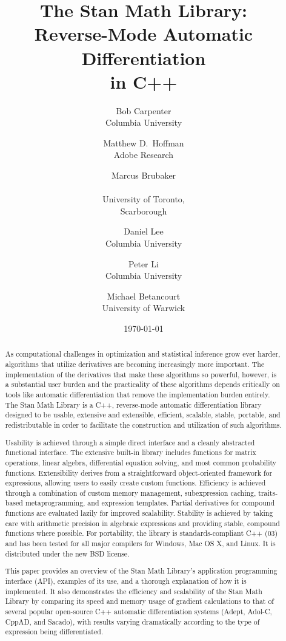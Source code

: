 \documentclass[12pt]{article}
\title{The Stan Math Library: \\ Reverse-Mode Automatic
  Differentiation \\ in C++}
\author{Bob Carpenter \\ {\small Columbia University}
        \and Matthew D.\ Hoffman \\ {\small Adobe Research}
        \and Marcus Brubaker 
        \\ {\small \begin{tabular}{c}University of Toronto, \\ Scarborough\end{tabular}}
        \and Daniel Lee \\ {\small Columbia University}
        \and Peter Li \\ {\small Columbia University}
        \and Michael Betancourt \\ {\small University of Warwick}
}
\date{\vspace*{8pt}\normalsize \today}
\begin{document}
\maketitle
\thispagestyle{empty}

\begin{abstract} 
  \noindent
  As computational challenges in optimization and statistical
  inference grow ever harder, algorithms that utilize derivatives are
  becoming increasingly more important.  The implementation of the
  derivatives that make these algorithms so powerful, however, is a
  substantial user burden and the practicality of these algorithms
  depends critically on tools like automatic differentiation that
  remove the implementation burden entirely.  The Stan Math Library is
  a C++, reverse-mode automatic differentiation library designed to be
  usable, extensive and extensible, efficient, scalable, stable,
  portable, and redistributable in order to facilitate the
  construction and utilization of such algorithms.

  Usability is achieved through a simple direct interface and a
  cleanly abstracted functional interface.  The extensive built-in
  library includes functions for matrix operations, linear algebra,
  differential equation solving, and most common probability
  functions.  Extensibility derives from a straightforward
  object-oriented framework for expressions, allowing users to easily
  create custom functions. Efficiency is achieved through a
  combination of custom memory management, subexpression caching,
  traits-based metaprogramming, and expression templates.  Partial
  derivatives for compound functions are evaluated lazily for improved
  scalability.  Stability is achieved by taking care with arithmetic
  precision in algebraic expressions and providing stable, compound
  functions where possible. For portability, the library is
  standards-compliant C++ (03) and has been tested for all major
  compilers for Windows, Mac OS X, and Linux.  It is distributed under
  the new BSD license.

  This paper provides an overview of the Stan Math Library's
  application programming interface (API), examples of its use, and a
  thorough explanation of how it is implemented.  It also demonstrates
  the efficiency and scalability of the Stan Math Library by comparing
  its speed and memory usage of gradient calculations to that of
  several popular open-source C++ automatic differentiation systems
  (Adept, Adol-C, CppAD, and Sacado), with results varying
  dramatically according to the type of expression being
  differentiated.
\end{abstract}
\end{document}
